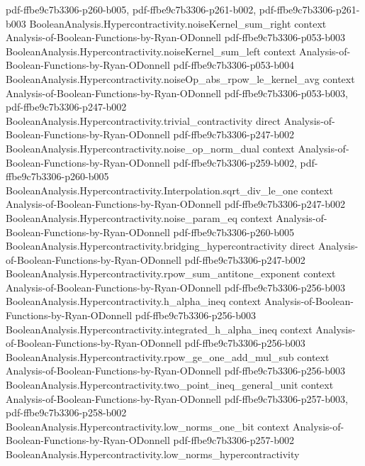 \begin{theorem}
  {pdf-ffbe9c7b3306-p260-b005,
    pdf-ffbe9c7b3306-p261-b002,
    pdf-ffbe9c7b3306-p261-b003}
\proofstep
  {BooleanAnalysis.Hypercontractivity.noiseKernel_sum_right}
  {context}
  {Analysis-of-Boolean-Functions-by-Ryan-ODonnell}
  {pdf-ffbe9c7b3306-p053-b003}
\proofstep
  {BooleanAnalysis.Hypercontractivity.noiseKernel_sum_left}
  {context}
  {Analysis-of-Boolean-Functions-by-Ryan-ODonnell}
  {pdf-ffbe9c7b3306-p053-b004}
\proofstep
  {BooleanAnalysis.Hypercontractivity.noiseOp_abs_rpow_le_kernel_avg}
  {context}
  {Analysis-of-Boolean-Functions-by-Ryan-ODonnell}
  {pdf-ffbe9c7b3306-p053-b003,
    pdf-ffbe9c7b3306-p247-b002}
\proofstep
  {BooleanAnalysis.Hypercontractivity.trivial_contractivity}
  {direct}
  {Analysis-of-Boolean-Functions-by-Ryan-ODonnell}
  {pdf-ffbe9c7b3306-p247-b002}
\proofstep
  {BooleanAnalysis.Hypercontractivity.noise_op_norm_dual}
  {context}
  {Analysis-of-Boolean-Functions-by-Ryan-ODonnell}
  {pdf-ffbe9c7b3306-p259-b002,
    pdf-ffbe9c7b3306-p260-b005}
\proofstep
  {BooleanAnalysis.Hypercontractivity.Interpolation.sqrt_div_le_one}
  {context}
  {Analysis-of-Boolean-Functions-by-Ryan-ODonnell}
  {pdf-ffbe9c7b3306-p247-b002}
\proofstep
  {BooleanAnalysis.Hypercontractivity.noise_param_eq}
  {context}
  {Analysis-of-Boolean-Functions-by-Ryan-ODonnell}
  {pdf-ffbe9c7b3306-p260-b005}
\proofstep
  {BooleanAnalysis.Hypercontractivity.bridging_hypercontractivity}
  {direct}
  {Analysis-of-Boolean-Functions-by-Ryan-ODonnell}
  {pdf-ffbe9c7b3306-p247-b002}
\proofstep
  {BooleanAnalysis.Hypercontractivity.rpow_sum_antitone_exponent}
  {context}
  {Analysis-of-Boolean-Functions-by-Ryan-ODonnell}
  {pdf-ffbe9c7b3306-p256-b003}
\proofstep
  {BooleanAnalysis.Hypercontractivity.h_alpha_ineq}
  {context}
  {Analysis-of-Boolean-Functions-by-Ryan-ODonnell}
  {pdf-ffbe9c7b3306-p256-b003}
\proofstep
  {BooleanAnalysis.Hypercontractivity.integrated_h_alpha_ineq}
  {context}
  {Analysis-of-Boolean-Functions-by-Ryan-ODonnell}
  {pdf-ffbe9c7b3306-p256-b003}
\proofstep
  {BooleanAnalysis.Hypercontractivity.rpow_ge_one_add_mul_sub}
  {context}
  {Analysis-of-Boolean-Functions-by-Ryan-ODonnell}
  {pdf-ffbe9c7b3306-p256-b003}
\proofstep
  {BooleanAnalysis.Hypercontractivity.two_point_ineq_general_unit}
  {context}
  {Analysis-of-Boolean-Functions-by-Ryan-ODonnell}
  {pdf-ffbe9c7b3306-p257-b003,
    pdf-ffbe9c7b3306-p258-b002}
\proofstep
  {BooleanAnalysis.Hypercontractivity.low_norms_one_bit}
  {context}
  {Analysis-of-Boolean-Functions-by-Ryan-ODonnell}
  {pdf-ffbe9c7b3306-p257-b002}
\proofstep
  {BooleanAnalysis.Hypercontractivity.low_norms_hypercontractivity}

\end{theorem}
